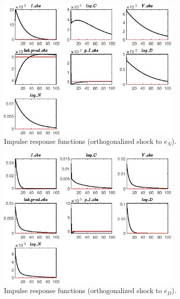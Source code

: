 \begin{figure}[H]
\centering 
\includegraphics[width=0.80\textwidth]{BRS_est_shopping/graphs/BRS_est_shopping_IRF_e_N}
\caption{Impulse response functions (orthogonalized shock to ${e_N}$).}
\label{Fig:IRF:e_N}
\end{figure}
 
\begin{figure}[H]
\centering 
\includegraphics[width=0.80\textwidth]{BRS_est_shopping/graphs/BRS_est_shopping_IRF_e_D}
\caption{Impulse response functions (orthogonalized shock to ${e_D}$).}
\label{Fig:IRF:e_D}
\end{figure}
 
 
